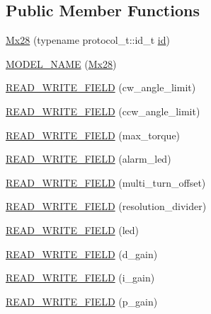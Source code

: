 \subsection*{Public Member Functions}
\begin{DoxyCompactItemize}
\item 
\hyperlink{classdynamixel_1_1servos_1_1_mx28_adea4ede69354101076170e0dca3803e8}{Mx28} (typename protocol\+\_\+t\+::id\+\_\+t \hyperlink{classdynamixel_1_1servos_1_1_servo_a2d022081672e25a7bb57b76706e1cc57}{id})
\item 
\hyperlink{classdynamixel_1_1servos_1_1_mx28_a449582e6be4e876dfd3c2fc8baebfe0c}{M\+O\+D\+E\+L\+\_\+\+N\+A\+M\+E} (\hyperlink{classdynamixel_1_1servos_1_1_mx28}{Mx28})
\item 
\hyperlink{classdynamixel_1_1servos_1_1_mx28_a72f7fd07e8b1eba0510fdfa419982d8e}{R\+E\+A\+D\+\_\+\+W\+R\+I\+T\+E\+\_\+\+F\+I\+E\+L\+D} (cw\+\_\+angle\+\_\+limit)
\item 
\hyperlink{classdynamixel_1_1servos_1_1_mx28_a7740c7fbf924f2a8798c73825e567a6b}{R\+E\+A\+D\+\_\+\+W\+R\+I\+T\+E\+\_\+\+F\+I\+E\+L\+D} (ccw\+\_\+angle\+\_\+limit)
\item 
\hyperlink{classdynamixel_1_1servos_1_1_mx28_a5943a81e2bd8182b0e179dfc82c0dd49}{R\+E\+A\+D\+\_\+\+W\+R\+I\+T\+E\+\_\+\+F\+I\+E\+L\+D} (max\+\_\+torque)
\item 
\hyperlink{classdynamixel_1_1servos_1_1_mx28_a9eed46d4353a9632a01d68dc58efff3c}{R\+E\+A\+D\+\_\+\+W\+R\+I\+T\+E\+\_\+\+F\+I\+E\+L\+D} (alarm\+\_\+led)
\item 
\hyperlink{classdynamixel_1_1servos_1_1_mx28_a46e2d0d30ec2eec94632fcac0482db83}{R\+E\+A\+D\+\_\+\+W\+R\+I\+T\+E\+\_\+\+F\+I\+E\+L\+D} (multi\+\_\+turn\+\_\+offset)
\item 
\hyperlink{classdynamixel_1_1servos_1_1_mx28_a434dfc6ab2c93bc6d64deaa1935b65e9}{R\+E\+A\+D\+\_\+\+W\+R\+I\+T\+E\+\_\+\+F\+I\+E\+L\+D} (resolution\+\_\+divider)
\item 
\hyperlink{classdynamixel_1_1servos_1_1_mx28_a31456611718e8d0e42bebf682988f498}{R\+E\+A\+D\+\_\+\+W\+R\+I\+T\+E\+\_\+\+F\+I\+E\+L\+D} (led)
\item 
\hyperlink{classdynamixel_1_1servos_1_1_mx28_a52a0e732b934d5945a31adb2d61c027b}{R\+E\+A\+D\+\_\+\+W\+R\+I\+T\+E\+\_\+\+F\+I\+E\+L\+D} (d\+\_\+gain)
\item 
\hyperlink{classdynamixel_1_1servos_1_1_mx28_ade3fdfa957647a81eb799b4ab10329d3}{R\+E\+A\+D\+\_\+\+W\+R\+I\+T\+E\+\_\+\+F\+I\+E\+L\+D} (i\+\_\+gain)
\item 
\hyperlink{classdynamixel_1_1servos_1_1_mx28_a0b47071e1333fcab8d171a84bf55e2a8}{R\+E\+A\+D\+\_\+\+W\+R\+I\+T\+E\+\_\+\+F\+I\+E\+L\+D} (p\+\_\+gain)

\end{DoxyCompactItemize}
